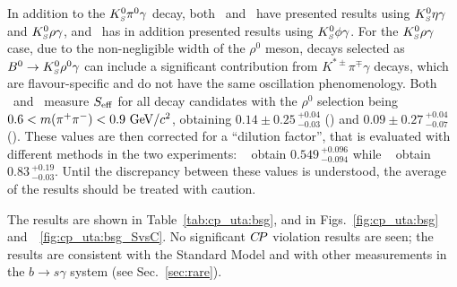 In addition to the $K^0_{\scriptscriptstyle S}\pi^0\gamma$ decay, both \babar\ and \belle\ have presented results using $K^0_{\scriptscriptstyle S}\eta\gamma$ and $K^0_{\scriptscriptstyle S}\rho\gamma$, and \belle\ has in addition presented results using $K^0_{\scriptscriptstyle S}\phi\gamma$.
For the $K^0_{\scriptscriptstyle S}\rho\gamma$ case, due to the non-negligible width of the $\rho^0$ meson, decays selected as $B^0 \to K^0_{\scriptscriptstyle S}\rho^0\gamma$ can include a significant contribution from $K^{*\pm}\pi^\mp\gamma$ decays, which are flavour-specific and do not have the same oscillation phenomenology. 
Both \babar\ and \belle\ measure $S_{\rm eff}$ for all \B decay candidates with the $\rho^0$ selection being $0.6 < m(\pi^+\pi^-) < 0.9 \ {\rm GeV}/c^2$, obtaining $0.14 \pm 0.25 \,^{+0.04}_{-0.03}$ (\babar) and $0.09 \pm 0.27 \,^{+0.04}_{-0.07}$ (\belle). These values are then corrected for a ``dilution factor'', that is evaluated with different methods in the two experiments: \babar~\cite{Akar:2013ima} obtain $0.549 \,^{+0.096}_{-0.094}$ while \belle~\cite{Li:2008qma} obtain $0.83 \,^{+0.19}_{-0.03}$. Until the discrepancy between these values is understood, the average of the results should be treated with caution.




The results are shown in Table~\ref{tab:cp_uta:bsg},
and in Figs.~\ref{fig:cp_uta:bsg} and~~\ref{fig:cp_uta:bsg_SvsC}.
No significant $C\!P$ violation results are seen;
the results are consistent with the Standard Model
and with other measurements in the $b \to s\gamma$ system (see Sec.~\ref{sec:rare}).

